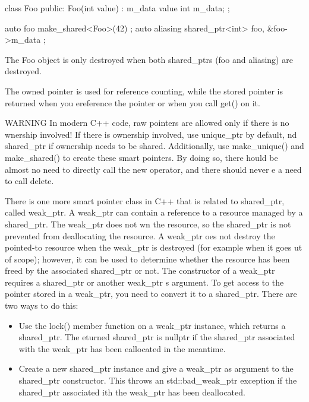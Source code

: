 \begin{cpp}
class Foo
{
    public:
    Foo(int value) : m_data { value } { }
    int m_data;
};

auto foo { make_shared<Foo>(42) };
auto aliasing { shared_ptr<int> { foo, &foo->m_data } };
\end{cpp}

The Foo object is only destroyed when both shared\_ptrs (foo and aliasing) are destroyed.

The owned pointer is used for reference counting, while the stored pointer is returned when you ereference the pointer or when you call get() on it.

\begin{myWarning}{WARNING}
In modern C++ code, raw pointers are allowed only if there is no wnership involved! If there is ownership involved, use unique\_ptr by default, nd shared\_ptr if ownership needs to be shared. Additionally, use make\_unique() and make\_shared() to create these smart pointers. By doing so, there hould be almost no need to directly call the new operator, and there should never e a need to call delete.
\end{myWarning}


There is one more smart pointer class in C++ that is related to shared\_ptr, called weak\_ptr. A weak\_ptr can contain a reference to a resource managed by a shared\_ptr. The weak\_ptr does not wn the resource, so the shared\_ptr is not prevented from deallocating the resource. A weak\_ptr oes not destroy the pointed-to resource when the weak\_ptr is destroyed (for example when it goes ut of scope); however, it can be used to determine whether the resource has been freed by the associated shared\_ptr or not. The constructor of a weak\_ptr requires a shared\_ptr or another weak\_ptr s argument. To get access to the pointer stored in a weak\_ptr, you need to convert it to a shared\_ptr. There are two ways to do this:

\begin{itemize}
\item
Use the lock() member function on a weak\_ptr instance, which returns a shared\_ptr. The eturned shared\_ptr is nullptr if the shared\_ptr associated with the weak\_ptr has been eallocated in the meantime.

\item
Create a new shared\_ptr instance and give a weak\_ptr as argument to the shared\_ptr constructor. This throws an std::bad\_weak\_ptr exception if the shared\_ptr associated ith the weak\_ptr has been deallocated.
\end{itemize}

